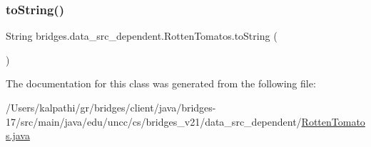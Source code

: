 \subsubsection{\texorpdfstring{to\+String()}{toString()}}
{\footnotesize\ttfamily String bridges.\+data\+\_\+src\+\_\+dependent.\+Rotten\+Tomatos.\+to\+String (\begin{DoxyParamCaption}{ }\end{DoxyParamCaption})}



The documentation for this class was generated from the following file\+:\begin{DoxyCompactItemize}
\item 
/\+Users/kalpathi/gr/bridges/client/java/bridges-\/17/src/main/java/edu/uncc/cs/bridges\+\_\+v21/data\+\_\+src\+\_\+dependent/\mbox{\hyperlink{_rotten_tomatos_8java}{Rotten\+Tomatos.\+java}}\end{DoxyCompactItemize}
